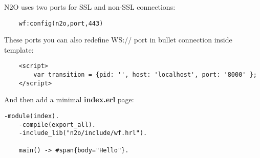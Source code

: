 N2O uses two ports for SSL and non-SSL connections: 

\vspace{1\baselineskip}
\begin{lstlisting}
    wf:config(n2o,port,443)
\end{lstlisting}
\vspace{1\baselineskip}

These ports you can also redefine WS:// port in bullet connection inside template:

\vspace{1\baselineskip}
\begin{lstlisting}
    <script>
        var transition = {pid: '', host: 'localhost', port: '8000' };
    </script>
\end{lstlisting}
\vspace{1\baselineskip}

And then add a minimal {\bf index.erl} page:

\begin{lstlisting}[caption=index.erl]
    -module(index).
    -compile(export_all).
    -include_lib("n2o/include/wf.hrl").

    main() -> #span{body="Hello"}.
\end{lstlisting}
